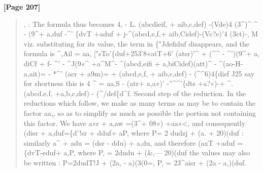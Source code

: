 \documentclass[11pt,a4paper]{book}
\begin{document}
\textbf{[Page 207]}\\[0.2cm]
\begin{quote}
, :
The formula thus becomes
4,
- L.
(abcdieif,
+
aib,c,def)
-(Vde)4
(3\textasciicircum{})\textasciicircum{}
\textasciicircum{}
- (9\textasciicircum{}+ a,duf -\textasciicircum{}' \{dvT +aduf
+ j-\textasciicircum{}(abcd,e,f,+ aib,Cidef)-(Vc?e)'4 (3ct)-,
M
viz. substituting for its value, the term in \{"Jdefiduf disappears, and the formula is
\textasciicircum{},Ail = aa, ["sTo'\{duf+253'8«atT+6' (atsr)'\textasciicircum{} + (\textasciicircum{}\textasciicircum{} - \textasciicircum{}')(9\textasciicircum{}+ a, diCf
+ f- \textasciicircum{}' - \textasciicircum{}J(9«\textasciicircum{} +a\textasciicircum{}M\textasciicircum{}- \textasciicircum{}(abcd,eifi + a,biCidef)(att)\textasciicircum{}
- \textasciicircum{}(ao-H- a,ait)= - *\textasciicircum{}' (acr + a9m)=
+ (abcd,e,f, + aib,c,def) - (\textasciicircum{}\textasciicircum{}6)4\{disf
J25
say for shortness this is
4
\textasciicircum{}
= aa,S - (atr+ a,a«)' -''\textasciicircum{}\textasciicircum{}'\{dts +a?«)-+
\textasciicircum{}.
(abcd.e.f, +a,b,c,def) - (\textasciicircum{}/def\{d\textasciicircum{}f.
Second step of the reduction.
In the reductions which follow, we make as many terms as may be to contain
the factor aa,, so as to simplify as much as possible the portion not containing this
factor.
We have a«r + a,aw =(3\textasciicircum{}+ 08») +aa«<, and consequently
(disr + a,duf=\{d'!sr + dduf+ aP,
where P= 2 dudzj + (a. + 20)(duf : similarly a\textasciicircum{} + adu = (dsr - ddu) + a,du, and therefore
(axT
+aduf =\{dvT-eduf+
a,P,
where P, = 2dudu + (\&,--- 20)(duf the values may also be written
:
P=2dudT!J + (2a, - a)(3(0=, P, = 23\textasciicircum{}aisr + (2a - a,)(duf.
\end{quote}
\end{document}
